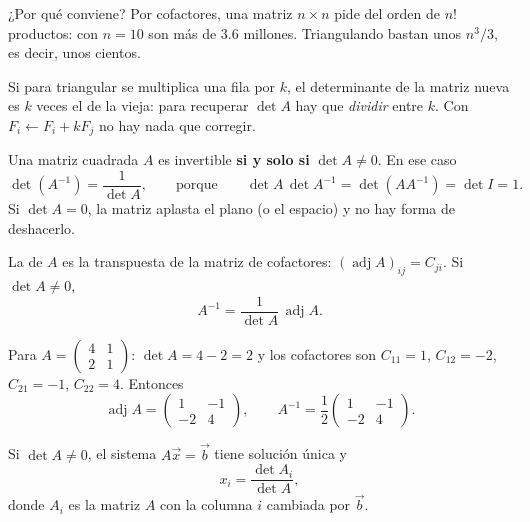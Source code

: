 \documentclass[11pt,a4paper]{article}
\newcommand{\sm}[1]{\left(\begin{smallmatrix}#1\end{smallmatrix}\right)}
\DeclareMathOperator{\adj}{adj}
\let\zukanivel\nivel
\renewcommand{\nivel}[2]{\needspace{10\baselineskip}\zukanivel{#1}{#2}}
\begin{document}
¿Por qué conviene? Por cofactores, una matriz $n\times n$ pide del orden de $n!$ productos: con $n=10$ son más de
$3.6$ millones. Triangulando bastan unos $n^3/3$, es decir, unos cientos.

\begin{ojo}
Si para triangular se multiplica una fila por $k$, el determinante de la matriz nueva es $k$ veces el de la vieja:
para recuperar $\det A$ hay que \emph{dividir} entre $k$. Con $F_i\leftarrow F_i+kF_j$ no hay nada que corregir.
\end{ojo}


\begin{propiedad}
Una matriz cuadrada $A$ es invertible \textbf{si y solo si} $\det A\neq0$. En ese caso
\[ \det\left(A^{-1}\right)=\frac{1}{\det A},\qquad\text{porque}\qquad \det A\,\det A^{-1}=\det\left(AA^{-1}\right)=\det I=1. \]
Si $\det A=0$, la matriz aplasta el plano (o el espacio) y no hay forma de deshacerlo.
\end{propiedad}

\begin{definicion}[Adjunta]
La  de $A$ es la transpuesta de la matriz de cofactores: $(\adj A)_{ij}=C_{ji}$. Si $\det A\neq0$,
\[ A^{-1}=\frac{1}{\det A}\,\adj A. \]
\end{definicion}

\begin{ejemplo}
Para $A=\sm{4&1\\2&1}$: $\det A=4-2=2$ y los cofactores son $C_{11}=1$, $C_{12}=-2$, $C_{21}=-1$, $C_{22}=4$. Entonces
\[ \adj A=\begin{pmatrix} 1 & -1\\ -2 & 4\end{pmatrix},\qquad A^{-1}=\frac12\begin{pmatrix} 1 & -1\\ -2 & 4\end{pmatrix}. \]
\end{ejemplo}

\begin{propiedad}
Si $\det A\neq0$, el sistema $A\vec x=\vec b$ tiene solución única y
\[ x_i=\frac{\det A_i}{\det A}, \]
donde $A_i$ es la matriz $A$ con la columna $i$ cambiada por $\vec b$.
\end{propiedad}
\end{document}
